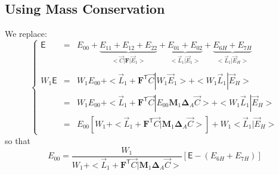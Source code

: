 \documentclass[aps,onecolumn,11pt]{revtex4}
\newcommand{\mytrn}[1]{{#1}^{\!\mathsf{T}}}
\newcommand{\mymat}[1]{{\bm{#1}}}
\begin{document}
\subsection{Using Mass Conservation}
We replace:
\begin{equation}
\left\lbrace
\begin{array}{rcl}
\mathsf{E}    & = & E_{00} 
+ \underbrace{E_{11}+E_{12}+E_{22}}_{<\vec{C}|\mymat{F}|\vec{E}_1>} 
+ \underbrace{E_{01}+E_{02}}_{<\vec{L}_1|\vec{E}_1>} 
+ \underbrace{E_{6H} + E_{7H}}_{<\vec{L}_1|\vec{E}_H>}\\
\\
W_1 \mathsf{E} & = & W_1 E_{00} + < \vec{L}_1 + \mytrn{\mymat{F}}\vec{C} | W_1 \vec{E}_1 > + <W_1 \vec{L}_1|\vec{E}_H> \\
& = & W_1 E_{00} + < \vec{L}_1 + \mytrn{\mymat{F}}\vec{C} | E_{00} \mymat{M}_1  \mymat{\Delta}_A \vec{C} > + <W_1 \vec{L}_1|\vec{E}_H> \\
& = & E_{00} \left[ W_1 + < \vec{L}_1 + \mytrn{\mymat{F}}\vec{C} | \mymat{M}_1  \mymat{\Delta}_A \vec{C} > \right] + W_1 <\vec{L}_1 | \vec{E}_H>
\end{array}
\right.
\end{equation}
so that
\begin{equation}
	E_{00} = \dfrac{W_1}{W_1 + < \vec{L}_1 + \mytrn{\mymat{F}}\vec{C} | \mymat{M}_1  \mymat{\Delta}_A \vec{C} >} \left[\mathsf{E}-(E_{6H}+E_{7H})\right]
\end{equation}
\end{document}
